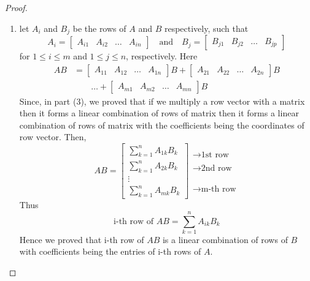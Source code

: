 \documentclass[12pt, a4paper]{article}
\theoremstyle{definition}
\theoremstyle{remark}
\begin{document}
\begin{proof}
\begin{enumerate}
        \item let $A_i$ and $B_j$ be the rows of $A$ and $B$ respectively, such that
        \[
        A_i = \begin{bmatrix}
            A_{i1} & A_{i2} & \ldots & A_{in}
        \end{bmatrix} \quad \text{and} \quad B_j = \begin{bmatrix}
            B_{j1} & B_{j2} & \ldots & B_{jp}
        \end{bmatrix}
        \]
        for $1 \le i \le m$ and $1 \le j \le n$, respectively. Here
        \begin{align*}
            AB &= \begin{bmatrix}
                A_{11} & A_{12} & \ldots & A_{1n}
            \end{bmatrix}B + \begin{bmatrix}
                A_{21} & A_{22} & \ldots & A_{2n}
            \end{bmatrix}B \\
            & \quad \quad \ldots + \begin{bmatrix}
                A_{m1} & A_{m2} & \ldots & A_{mn}
            \end{bmatrix}B
        \end{align*}
        Since, in part (3), we proved that if we multiply a row vector with a matrix then it forms a linear combination of rows of matrix then it forms a linear combination of rows of matrix with the coefficients being the coordinates of row vector. Then,
        \[
        AB = \begin{bmatrix}
            \displaystyle\sum_{k=1}^n A_{1k}B_k \\
            \displaystyle\sum_{k=1}^n A_{2k}B_k \\
            \vdots \\
            \displaystyle\sum_{k=1}^n A_{mk}B_k
        \end{bmatrix} \begin{matrix}
            \to \text{1st row} \\ \\
            \to \text{2nd row} \\
            \\ \\ \\
            \to \text{m-th row}
        \end{matrix}
        \]
        Thus
        \[\text{i-th row of } AB = \sum_{k=1}^n A_{ik}B_k\]
        Hence we proved that i-th row of $AB$ is a linear combination of rows of $B$ with coefficients being the entries of i-th rows of $A$.
    \end{enumerate}
\end{proof}
\end{document}
